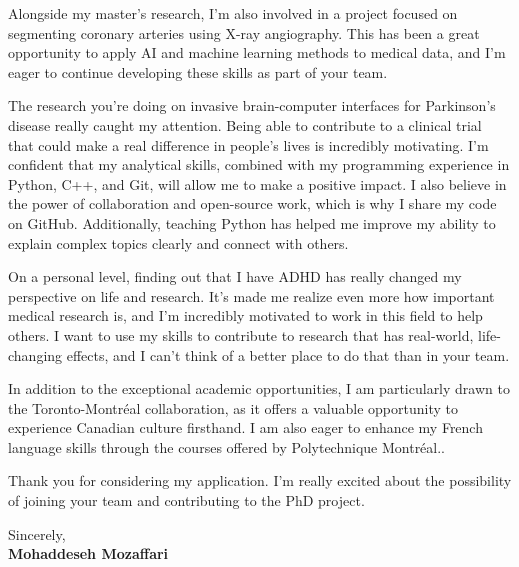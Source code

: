 \documentclass[letterpaper,11pt]{letter}
\begin{document}
Alongside my master’s research, I’m also involved in a project focused on segmenting coronary arteries using X-ray angiography. This has been a great opportunity to apply AI and machine learning methods to medical data, and I’m eager to continue developing these skills as part of your team.


The research you’re doing on invasive brain-computer interfaces for Parkinson’s disease really caught my attention. Being able to contribute to a clinical trial that could make a real difference in people’s lives is incredibly motivating. I’m confident that my analytical skills, combined with my programming experience in Python, C++, and Git, will allow me to make a positive impact. I also believe in the power of collaboration and open-source work, which is why I share my code on GitHub. Additionally, teaching Python has helped me improve my ability to explain complex topics clearly and connect with others.

On a personal level, finding out that I have ADHD has really changed my perspective on life and research. It’s made me realize even more how important medical research is, and I’m incredibly motivated to work in this field to help others. I want to use my skills to contribute to research that has real-world, life-changing effects, and I can’t think of a better place to do that than in your team.

In addition to the exceptional academic opportunities, I am particularly drawn to the Toronto-Montréal collaboration, as it offers a valuable opportunity to experience Canadian culture firsthand. I am also eager to enhance my French language skills through the courses offered by Polytechnique Montréal..

Thank you for considering my application. I’m really excited about the possibility of joining your team and contributing to the PhD project.


\begin{flushleft}
    Sincerely, \\
    \textbf{Mohaddeseh Mozaffari}
\end{flushleft}
\end{document}
